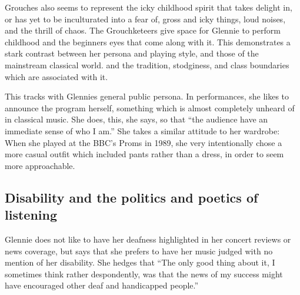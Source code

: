 \documentclass[12pt,letterpaper]{article}
\begin{document}
	Grouches also seems to represent the icky childhood spirit that takes
	delight in, or has yet to be inculturated into a fear of, gross and
	icky things, loud noises, and the thrill of chaos. The Grouchketeers 
	give space for Glennie to perform childhood and the beginners eyes that
	come along with it. This demonstrates a stark contrast between her 
	persona and playing style, and those of the mainstream classical world.
	and the tradition, stodginess, and class boundaries which are associated
	with it.

	This tracks with Glennies general public persona. In performances, she 
	likes to announce the program herself, something which is almost
	completely unheard of in classical music. She does, this, she says, so 
	that ``the audience have an immediate sense of who I 
	am.''\autocite[3]{Glennie} She takes a similar attitude to her wardrobe:
	When she played at the BBC's Proms in 1989, she very intentionally chose
	a more casual outfit which included pants rather than a dress, in order
	to seem more approachable.  

	\subsection*{Disability and the politics and poetics of listening}	


	Glennie does not like to have her deafness highlighted in her 
	concert reviews or news coverage, but says that she prefers to have her 
	music judged with no mention of her disability. She hedges that ``The 
	only good thing about it, I sometimes think rather despondently, was 
	that the news of my success might have encouraged other deaf and 
	handicapped people.''\autocite[59]{Glennie}
\end{document}
